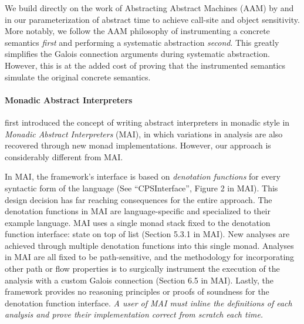 \par

We build directly on the work of Abstracting Abstract Machines (AAM) by
\citet{davdar:van-horn:2010:aam} and
\citet{dvanhorn:Smaragdakis2011Pick} in our parameterization of abstract
time to achieve call-site and object sensitivity. More notably, we
follow the AAM philosophy of instrumenting a concrete semantics
\emph{first} and performing a systematic abstraction \emph{second}. This
greatly simplifies the Galois connection arguments during systematic
abstraction. However, this is at the added cost of proving that the
instrumented semantics simulate the original concrete semantics.

\par

\paragraph{Monadic Abstract Interpreters}

\par

\citeauthor{dvanhorn:Sergey2013Monadic} first introduced the concept of
writing abstract interpreters in monadic style in \emph{Monadic Abstract
Interpreters} (MAI)\cite{dvanhorn:Sergey2013Monadic}, in which
variations in analysis are also recovered through new monad
implementations. However, our approach is considerably different from
MAI.

\par

In MAI, the framework's interface is based on \emph{denotation
functions} for every syntactic form of the language (See
``CPSInterface'', Figure 2 in MAI). This design decision has far
reaching consequences for the entire approach. The denotation functions
in MAI are language-specific and specialized to their example language.
MAI uses a single monad stack fixed to the denotation function
interface: state on top of list (Section 5.3.1 in MAI). New analyses are
achieved through multiple denotation functions into this single monad.
Analyses in MAI are all fixed to be path-sensitive, and the methodology
for incorporating other path or flow properties is to surgically
instrument the execution of the analysis with a custom Galois connection
(Section 6.5 in MAI). Lastly, the framework provides no reasoning
principles or proofs of soundness for the denotation function interface.
\emph{A user of MAI must inline the definitions of each analysis and
prove their implementation correct from scratch each time.}

